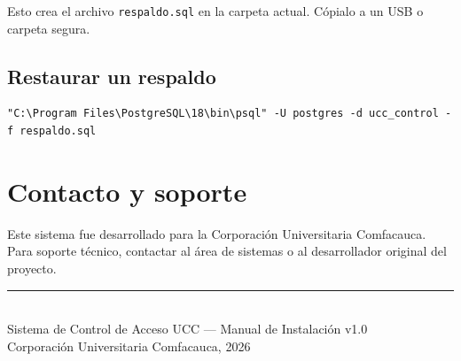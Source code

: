 \documentclass[12pt, a4paper]{article}
\begin{document}
Esto crea el archivo \texttt{respaldo.sql} en la carpeta actual.
Cópialo a un USB o carpeta segura.

\subsection{Restaurar un respaldo}

\begin{lstlisting}
"C:\Program Files\PostgreSQL\18\bin\psql" -U postgres -d ucc_control -f respaldo.sql
\end{lstlisting}

\section{Contacto y soporte}

Este sistema fue desarrollado para la Corporación Universitaria
Comfacauca. Para soporte técnico, contactar al área de sistemas
o al desarrollador original del proyecto.

\vspace{1cm}
\begin{center}
  {\color{uccazul}\rule{0.5\textwidth}{0.5pt}}\\[0.5em]
  {\small\color{uccgris}
    Sistema de Control de Acceso UCC — Manual de Instalación v1.0 \\
    Corporación Universitaria Comfacauca, 2026
  }
\end{center}
\end{document}
